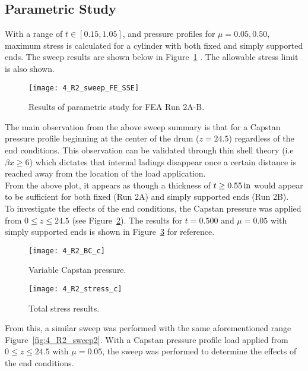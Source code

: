 \subsection{Parametric Study}

With a range of $t\in [0.15, 1.05]$, and pressure profiles for $\mu =0.05, 0.50$, maximum stress is calculated for a cylinder with both fixed and simply supported ends. The sweep results are shown below in Figure~\ref{fig:4_R2_sweep} \cite{EXCEL}.  The allowable stress limit is also shown.

\begin{figure}[H]
	\centering
	\texttt{[image: 4\_R2\_sweep\_FE\_SSE]}
	\caption{Results of parametric study for FEA Run 2A-B.}
	\label{fig:4_R2_sweep}
\end{figure}

The main observation from the above sweep summary is that for a Capstan pressure profile beginning at the center of the drum ($z=24.5$) regardless of the end conditions. This observation can be validated through thin shell theory (i.e $\beta x \geq 6$) which dictates that internal ladings disappear once a certain distance is reached away from the location of the load application.\\

From the above plot, it appears as though a thickness of $t \geq 0.55 \,\mathrm{in}$ would appear to be sufficient for both fixed (Run 2A) and simply supported ends (Run 2B).\\

To investigate the effects of the end conditions, the Capstan pressure was applied from $0 \leq z \leq 24.5$ (see Figure~\ref{fig:4_R2_BC_c}). The results for $t=0.500$ and $\mu=0.05$ with simply supported ends is shown in Figure~\ref{fig:4_R2_stress_c} for reference.
\begin{figure}[H]
	\centering
	\texttt{[image: 4\_R2\_BC\_c]}
	\caption{Variable Capstan pressure.}
	\label{fig:4_R2_BC_c}
\end{figure}

\begin{figure}[H]
	\centering
	\texttt{[image: 4\_R2\_stress\_c]}
	\caption{Total stress results.}
	\label{fig:4_R2_stress_c}
\end{figure}

From this, a similar sweep was performed with the same aforementioned range Figure~\ref{fig:4_R2_sweep2}. With a Capstan pressure profile load applied from $0 \leq z \leq 24.5$ with $\mu=0.05$, the sweep was performed to determine the effects of the end conditions.

